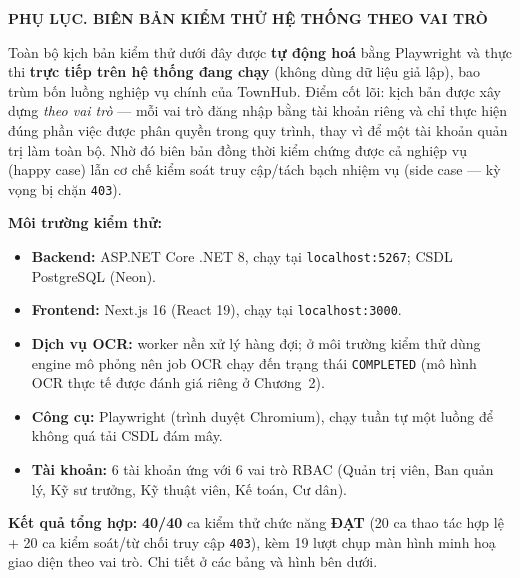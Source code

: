 \clearpage
{}
{}

\begin{center}\textbf{\large PHỤ LỤC. BIÊN BẢN KIỂM THỬ HỆ THỐNG THEO VAI TRÒ}\end{center}
\smallskip

Toàn bộ kịch bản kiểm thử dưới đây được \textbf{tự động hoá} bằng Playwright và thực thi \textbf{trực tiếp trên hệ thống đang chạy} (không dùng dữ liệu giả lập), bao trùm bốn luồng nghiệp vụ chính của TownHub. Điểm cốt lõi: kịch bản được xây dựng \textit{theo vai trò} — mỗi vai trò đăng nhập bằng tài khoản riêng và chỉ thực hiện đúng phần việc được phân quyền trong quy trình, thay vì để một tài khoản quản trị làm toàn bộ. Nhờ đó biên bản đồng thời kiểm chứng được cả nghiệp vụ (happy case) lẫn cơ chế kiểm soát truy cập/tách bạch nhiệm vụ (side case — kỳ vọng bị chặn \texttt{403}).

\textbf{Môi trường kiểm thử:}
\begin{itemize}[leftmargin=1.5em,itemsep=1pt,topsep=2pt]
  \item \textbf{Backend:} ASP.NET Core .NET 8, chạy tại \texttt{localhost:5267}; CSDL PostgreSQL (Neon).
  \item \textbf{Frontend:} Next.js 16 (React 19), chạy tại \texttt{localhost:3000}.
  \item \textbf{Dịch vụ OCR:} worker nền xử lý hàng đợi; ở môi trường kiểm thử dùng engine mô phỏng nên job OCR chạy đến trạng thái \texttt{COMPLETED} (mô hình OCR thực tế được đánh giá riêng ở Chương~2).
  \item \textbf{Công cụ:} Playwright (trình duyệt Chromium), chạy tuần tự một luồng để không quá tải CSDL đám mây.
  \item \textbf{Tài khoản:} 6 tài khoản ứng với 6 vai trò RBAC (Quản trị viên, Ban quản lý, Kỹ sư trưởng, Kỹ thuật viên, Kế toán, Cư dân).
\end{itemize}

\textbf{Kết quả tổng hợp:} \textbf{40/40} ca kiểm thử chức năng \textbf{ĐẠT} (20 ca thao tác hợp lệ + 20 ca kiểm soát/từ chối truy cập \texttt{403}), kèm 19 lượt chụp màn hình minh hoạ giao diện theo vai trò. Chi tiết ở các bảng và hình bên dưới.

